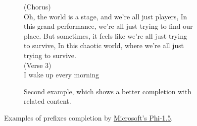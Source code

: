 \documentclass{article}
\begin{document}
\begin{figure*}[h!]
\begin{subfigure}{\textwidth}
\begin{tcolorbox}[colframe=black!10!white, colback=black!5!white]
\begin{minipage}{\textwidth}
                (Chorus)\\
                Oh, the world is a stage, and we're all just players,
                In this grand performance, we're all just trying to find our place.
                But sometimes, it feels like we're all just trying to survive,
                In this chaotic world, where we're all just trying to survive.\\

                (Verse 3)\\
                I wake up every morning
            \end{minipage}
        \end{tcolorbox}
        \vspace{-0.5\baselineskip}
        \caption{Second example, which shows a better completion with related content.}
        \vspace{0.5\baselineskip}
    \end{subfigure}
    \caption{Examples of prefixes completion by \href{https://huggingface.co/microsoft/phi-1_5}{Microsoft's Phi-1.5}.}
    \label{I3:phi-1_5-examples}
\end{figure*}

\end{document}
